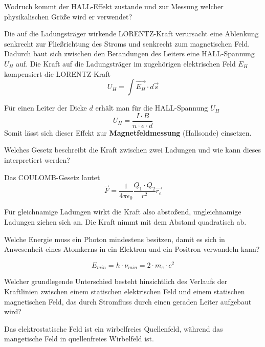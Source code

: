 \documentclass[12pt,a4paper,ngerman]{article}
\begin{document}
\pagebreak


\begin{framed}
Wodruch kommt der HALL-Effekt zustande und zur Messung welcher physikalischen Größe wird er verwendet?
\end{framed}
Die auf die Ladungsträger wirkende LORENTZ-Kraft verursacht eine Ablenkung senkrecht zur Fließrichtung des Stroms und senkrecht zum magnetischen Feld. Dadurch baut sich zwischen den Berandungen des Leiters eine HALL-Spannung $U_H$ auf. Die Kraft auf die Ladungsträger im zugehörigen elektrischen Feld $E_H$ kompensiert die LORENTZ-Kraft
\begin{equation*}
U_H = \int{\vec{E_H}\cdot d\vec{s}}
\end{equation*}

Für einen Leiter der Dicke $d$ erhält man für die HALL-Spannung $U_H$
\begin{equation*}
U_H = \frac{I \cdot B}{n \cdot e \cdot d}
\end{equation*}
Somit lässt sich dieser Effekt zur \textbf{Magnetfeldmessung} (Hallsonde) einsetzen. 



\begin{framed}
Welches Gesetz beschreibt die Kraft zwischen zwei Ladungen und wie kann dieses interpretiert werden?
\end{framed}

Das COULOMB-Gesetz lautet
\begin{equation*}
\vec{F} = \frac{1}{4 \pi \epsilon_0}\frac{Q_1 \cdot Q_2}{r^2}\vec{r_e}
\end{equation*}

Für gleichnamige Ladungen wirkt die Kraft also abstoßend, ungleichnamige Ladungen ziehen sich an. Die Kraft nimmt mit dem Abstand quadratisch ab. 



\begin{framed}
Welche Energie muss ein Photon mindestens besitzen, damit es sich in Anwesenheit eines Atomkerns in ein Elektron und ein Positron verwandeln kann?
\end{framed}
\begin{equation*}
E_{min} = h \cdot \nu_{min} = 2 \cdot m_e \cdot c^2
\end{equation*}



\begin{framed}
Welcher grundlegende Unterschied besteht hinsichtlich des Verlaufs der Kraftlinien zwischen einem statischen elektrischen Feld und einem statischen magnetischen Feld, das durch Stromfluss durch einen geraden Leiter aufgebaut wird?
\end{framed}
Das elektrostatische Feld ist ein wirbelfreies Quellenfeld, während das mangetische Feld in quellenfreies Wirbelfeld ist. 
\end{document}
